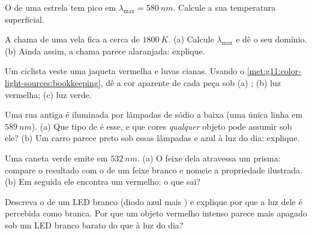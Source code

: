 \begin{exercise}[$\star$]\label{exo:g11:color-light-sources:5}
O  de uma estrela tem pico em
$\lambda_{\max} = \qty{580}{nm}$. Calcule a sua temperatura superficial.
\end{exercise}

\begin{exercise}[$\star\star$]\label{exo:g11:color-light-sources:6}
A chama de uma vela fica a cerca de $\qty{1800}{K}$. (a) Calcule
$\lambda_{\max}$ e dê o seu domínio. (b) Ainda assim, a chama parece
alaranjada: explique.
\end{exercise}

\begin{exercise}[$\star\star$]\label{exo:g11:color-light-sources:7}
Um ciclista veste uma jaqueta vermelha e luvas cianas. Usando o
\cref{met:g11:color-light-sources:bookkeeping}, dê a cor aparente de cada
peça sob (a) ; (b) luz vermelha; (c) luz verde.
\end{exercise}

\begin{exercise}[$\star\star$]\label{exo:g11:color-light-sources:8}
Uma rua antiga é iluminada por lâmpadas de sódio a baixa  (uma
única linha em $\qty{589}{nm}$). (a) Que tipo de  é esse, e que
cores \emph{qualquer} objeto pode assumir sob ele? (b) Um carro parece
preto sob essas lâmpadas e azul à luz do dia: explique.
\end{exercise}

\begin{exercise}[$\star\star$]\label{exo:g11:color-light-sources:9}
Uma caneta  verde emite em $\qty{532}{nm}$. (a) O feixe dela
atravessa um prisma: compare o resultado com o de um feixe branco e
nomeie a propriedade ilustrada. (b) Em seguida ele encontra um 
vermelho: o que sai?
\end{exercise}

\begin{exercise}[$\star\star$]\label{exo:g11:color-light-sources:10}
Descreva o  de um LED branco (diodo azul mais ) e explique
por que a luz dele é percebida como branca. Por que um objeto vermelho
intenso parece mais apagado sob um LED branco barato do que à luz do dia?
\end{exercise}

